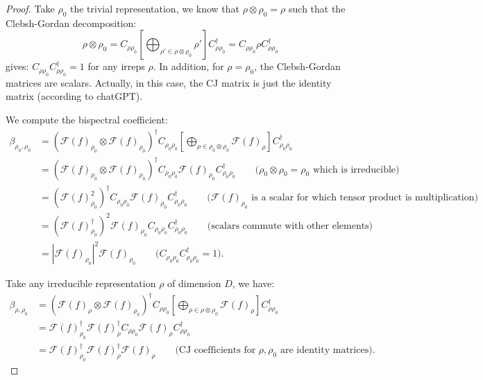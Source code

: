 \documentclass{article}
\begin{document}
\begin{proof}
    Take $\rho_0$ the trivial representation, we know that $\rho \otimes \rho_0  = \rho$ such that the Clebsh-Gordan decomposition:
    \begin{equation}
        \rho \otimes \rho_0 = C_{{\rho} {\rho_0}}\left[
    \bigoplus_{\rho' \in \rho \otimes \rho_0}
        \rho'
    \right] C_{{\rho} {\rho_0}}^{\dagger} = C_{{\rho} {\rho_0}}
        \rho C_{{\rho} {\rho_0}}^{\dagger}
    \end{equation}
    gives: $C_{{\rho} {\rho_0}} C_{{\rho} {\rho_0}}^{\dagger}  = 1$ for any irreps $\rho$. In addition, for $\rho = \rho_0$, the Clebsh-Gordan matrices are scalars. Actually, in this case, the CJ matrix is just the identity matrix (according to chatGPT).

    We compute the bispectral coefficient:
    \begin{align*}
    \beta_{\rho_0, \rho_0}
    &=
    (\mathcal{F}(f)_{\rho_0} \otimes \mathcal{F}(f)_{\rho_0})^\dagger C_{{\rho_0} {\rho_0}}
    \left[
    \bigoplus_{\rho \in \rho_0 \otimes \rho_0}
        \mathcal{F}(f)_\rho
    \right] C_{{\rho_0} {\rho_0}}^{\dagger} \\
    &=
    (\mathcal{F}(f)_{\rho_0} \otimes \mathcal{F}(f)_{\rho_0})^\dagger C_{{\rho_0} {\rho_0}}
        \mathcal{F}(f)_{\rho_0}
     C_{{\rho_0} {\rho_0}}^{\dagger}
    \qquad \text{($\rho_0 \otimes \rho_0 = \rho_0$ which is irreducible)}
    \\
    &=
    (\mathcal{F}(f)_{\rho_0}^2)^\dagger C_{{\rho_0} {\rho_0}}
        \mathcal{F}(f)_{\rho_0}
     C_{{\rho_0} {\rho_0}}^{\dagger}
    \qquad \text{($\mathcal{F}(f)_{\rho_0}$ is a scalar for which tensor product is multiplication)}
    \\
    &=(\mathcal{F}(f)_{\rho_0}^\dagger)^2 \mathcal{F}(f)_{\rho_0}
    C_{{\rho_0} {\rho_0}} C_{{\rho_0} {\rho_0}}^{\dagger}
    \qquad\text{(scalars commute with other elements)}\\
    &=|\mathcal{F}(f)_{\rho_0}|^2 \mathcal{F}(f)_{\rho_0}
    \qquad\text{($C_{{\rho_0} {\rho_0}} C_{{\rho_0} {\rho_0}}^{\dagger}  = 1$).}
    \end{align*}

    Take any irreducible representation $\rho$ of dimension $D$, we have:
    \begin{align*}
        \beta_{\rho, \rho_0}
        &= (\mathcal{F}(f)_{\rho} \otimes \mathcal{F}(f)_{\rho_0})^\dagger C_{{\rho} {\rho_0}}
    \left[
    \bigoplus_{\rho \in \rho \otimes \rho_0}
        \mathcal{F}(f)_\rho
    \right] C_{{\rho} {\rho_0}}^{\dagger} \\
        &= \mathcal{F}(f)_{\rho_0}^\dagger \mathcal{F}(f)_{\rho}^\dagger C_{{\rho} {\rho_0}}
        \mathcal{F}(f)_{\rho} C_{{\rho} {\rho_0}}^{\dagger} \\
        &=\mathcal{F}(f)_{\rho_0}^\dagger \mathcal{F}(f)_{\rho}^\dagger\mathcal{F}(f)_{\rho} \qquad\text{(CJ coefficients for $\rho, \rho_0$ are identity matrices)}.
    \end{align*}
    \end{proof}
\end{document}
